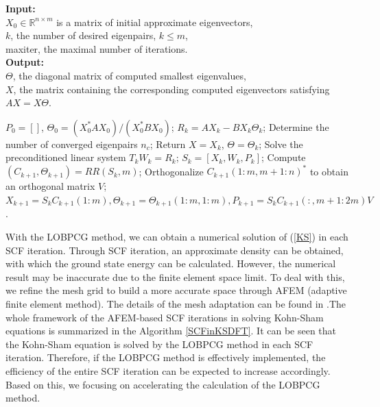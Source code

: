 \documentclass[12pt]{article}
\numberwithin{figure}{section}
\numberwithin{table}{section}
\begin{document}
\begin{algorithm}[htbp]
	\caption{The LOBPCG algorithm}
	\textbf{Input:} \\
	$X_0\in\mathbb{R}^{n\times m}$ is a matrix of initial approximate eigenvectors,\\ 
	$k$, the number of desired eigenpairs, $k\leq m$,\\
	maxiter, the maximal number of iterations.\\
	\textbf{Output:} \\
	\quad $\Theta$, the diagonal matrix of computed smallest eigenvalues, \\
	\quad $X$, the matrix containing the corresponding computed eigenvectors satisfying $AX = X\Theta$.
	\begin{algorithmic}[1]
		\State $P_0=[]$, $\Theta_0 = (X_0^* AX_0)/(X_0^* B X_0)$;
		\State $R_k=AX_k - BX_k \Theta_k$;
		\State Determine the number of converged eigenpairs $n_c$;
		\State Return $X=X_k$, $\Theta = \Theta_k$;
		\EndIf
		\State Solve the preconditioned linear system $T_k W_k=R_k$;
		\State $S_{k}=[X_k,W_k,P_k]$;
		\State Compute $(C_{k+1},\Theta_{k+1}) = RR(S_k,m)$;
		\State Orthogonalize  $C_{k+1}(1:m,m+1:n)^*$ to obtain an orthogonal matrix $V$;
		\State $X_{k+1}=S_k C_{k+1}(1:m),\Theta_{k+1}=\Theta_{k+1}(1:m,1:m),P_{k+1}=S_kC_{k+1}(:,m+1:2m)V$.
		\EndFor
	\end{algorithmic}
	\label{LOBPCGAlgorithm}
\end{algorithm}

With the LOBPCG method, we can obtain a numerical solution of (\ref{KS}) in each SCF iteration. Through SCF iteration, an approximate density can be obtained, with which the ground state energy can be calculated. However, the numerical result may be inaccurate due to the finite element space limit. To deal with this, we refine the mesh grid to build a more accurate space through AFEM (adaptive finite element method). The details of the mesh adaptation can be found in \cite{bao2012h,bao2013numerical}.The whole framework of the AFEM-based SCF iterations in solving Kohn-Sham equations is summarized in the Algorithm \ref{SCFinKSDFT}. It can be seen that the Kohn-Sham equation is solved by the LOBPCG method in each SCF iteration. Therefore, if the LOBPCG method is effectively implemented, the efficiency of the entire SCF iteration can be expected to increase accordingly. Based on this, we focusing on accelerating the calculation of the LOBPCG method.
\end{document}
